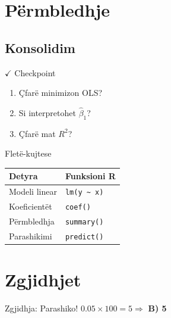 \documentclass[aspectratio=169,10pt,xcolor={dvipsnames,table}]{beamer}
\newcommand{\Rkey}[1]{\texttt{\textcolor{uptmid}{#1}}}
\newcommand{\kthehu}[1]{\hyperlink{#1}{\beamerreturnbutton{Kthehu}}}
\begin{document}
\section{Përmbledhje}
\subsection{Konsolidim}
\begin{frame}{\textcolor{accent}{$\checkmark$} Checkpoint}
  \begin{enumerate}
    \item Çfarë minimizon OLS?
    \item Si interpretohet $\hat\beta_1$?
    \item Çfarë mat $R^2$?
  \end{enumerate}
\end{frame}

\begin{frame}{Fletë-kujtese}
  \begin{tabular}{@{}ll@{}}
    \toprule
    Detyra & Funksioni R \\ \midrule
    Modeli linear & \Rkey{lm(y \textasciitilde{} x)} \\
    Koeficientët & \Rkey{coef()} \\
    Përmbledhja & \Rkey{summary()} \\
    Parashikimi & \Rkey{predict()} \\ \bottomrule
  \end{tabular}
\end{frame}

\appendix
\section*{Zgjidhjet}
\begin{frame}[label=zgjidhja1]{Zgjidhja: Parashiko!}
  $0.05\times100=5 \Rightarrow$ \textbf{B) 5}
  \vfill\kthehu{pyetja1}
\end{frame}
\end{document}
